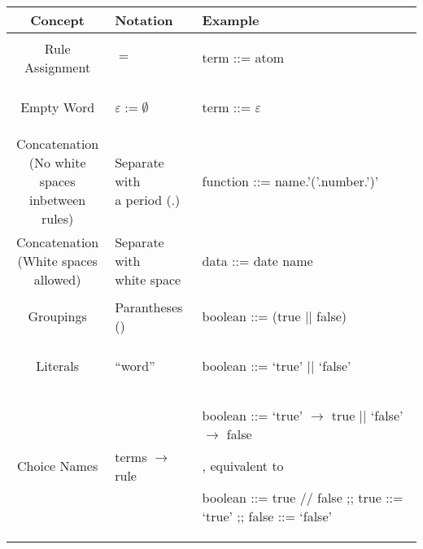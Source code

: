 \begin{center}
  \begin{tabular}{ | c | p{2cm} | p{6cm} | }
  \hline
  \textbf{Concept} & \textbf{Notation} & \textbf{Example} \\
  \hline
	Rule Assignment & $=$ & \begin{bnf} term ::= atom\end{bnf}\\
  \hline
  Empty Word & $\varepsilon := \emptyset$ & \begin{bnf} term ::= $\varepsilon$ \end{bnf} \\
    \hline
  \makecell{Concatenation \\ (No white spaces \\ inbetween rules)} & \makecell{Separate with \\  a period (.)}&  \begin{bnf} function ::= name.'('.number.')'\end{bnf} \\
  \hline
  \makecell{Concatenation \\ (White spaces \\ allowed)} & \makecell{Separate with \\ white space} & \begin{bnf} data ::= date name\end{bnf} \\
    \hline
    Groupings & Parantheses () & \begin{bnf} boolean ::= (true || false)\end{bnf} \\
    \hline
    Literals & ``word'' & \begin{bnf} boolean ::= `true' || `false' \end{bnf} \\
    \hline
  Choice Names & terms $\to$ rule & \makecell{\begin{bnf} boolean ::= `true' $\to$ true || `false' $\to$ false \end{bnf}, \\ equivalent to \\ \begin{bnf}  boolean ::= true // false ;; true ::= `true' ;; false ::= `false' \end{bnf}} \\
    \hline
\end{tabular}
\end{center}
